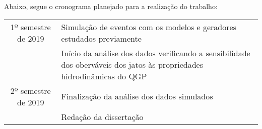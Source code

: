 Abaixo, segue o cronograma planejado para a realização do trabalho:

\begin{tabular}{|c|p{8cm}|}
  \hline
  1º semestre de 2019 & Simulação de eventos com os modelos e geradores estudados previamente \\
  		      & Início da análise dos dados verificando a sensibilidade dos oberváveis dos jatos às propriedades hidrodinâmicas do QGP \\ \hline
  2º semestre de 2019 & Finalização da análise dos dados simulados \\
  		      & Redação da dissertação \\ \hline
\end{tabular}